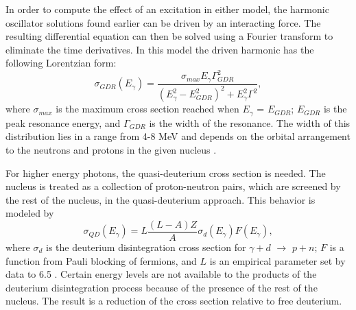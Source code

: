     In order to compute the effect of an excitation in either model, 
      the harmonic oscillator solutions found earlier can be driven by an 
      interacting force.
    The resulting differential equation can then be solved using a Fourier 
      transform to eliminate the time derivatives.
    In this model the driven harmonic has the following Lorentzian form:
    \begin{equation}
      \sigma_{GDR}(E_{\gamma})=\frac{\sigma_{max}E_{\gamma}\Gamma_{GDR}^{2}}
      {\left(E_{\gamma}^{2}-E_{GDR}^{2}\right)^{2}+E_{\gamma}^{2}\Gamma^{2}},
      \label{eq:gdrRes}
    \end{equation}
      where $\sigma_{max}$ is the maximum cross section reached when $E_{\gamma}$ = 
      $E_{GDR}$; $E_{GDR}$ is the peak resonance energy, and $\Gamma_{GDR}$ is 
      the width of the resonance.
    The width of this distribution lies in a range from 4-8 
      MeV and depends on the orbital arrangement to the neutrons and protons in
      the given nucleus \cite{emPCite6}.
    
    For higher energy photons, the quasi-deuterium cross section is needed.
    The nucleus is treated as a collection of proton-neutron pairs, which are 
      screened by the rest of the nucleus, in the quasi-deuterium approach.
    This behavior is modeled by \cite{emPCite4}
    \begin{equation}
      \sigma_{QD}(E_{\gamma})=L\frac{(L-A)Z}{A}\sigma_{d}(E_{\gamma})F(E_{\gamma}),
      \label{eq:qdSigma}
    \end{equation}
    where $\sigma_{d}$ is the deuterium disintegration cross section for 
      $\gamma+d$ $\rightarrow$ $p+n$;
    $F$ is a function from Pauli blocking of fermions, and $L$ is 
      an empirical parameter set by data to 6.5 \cite{emPCite4}.
    Certain energy levels are not available to the products of the deuterium 
      disintegration process because of the presence of the rest of the nucleus.
    The result is a reduction of the cross section relative to free deuterium.
    
